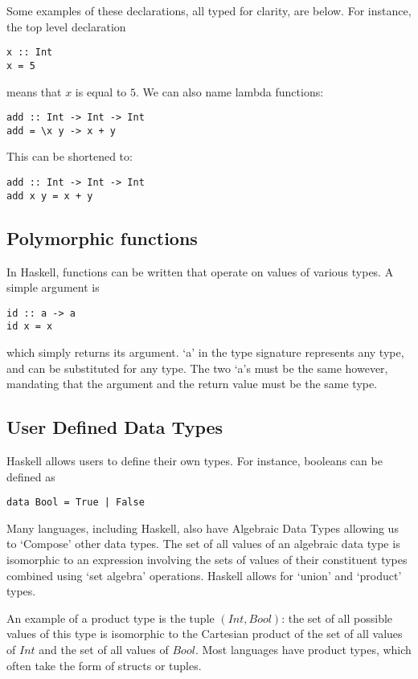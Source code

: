 Some examples of these declarations, all typed for clarity, are below. For instance, the top level declaration
\begin{verbatim}
x :: Int
x = 5
\end{verbatim}
means that $x$ is equal to $5$. We can also name lambda functions:
\begin{verbatim}
add :: Int -> Int -> Int
add = \x y -> x + y
\end{verbatim}
This can be shortened to:
\begin{verbatim}
add :: Int -> Int -> Int
add x y = x + y
\end{verbatim}

\subsection{Polymorphic functions}
In Haskell, functions can be written that operate on values of various types. A simple argument is 

\begin{verbatim}
id :: a -> a
id x = x
\end{verbatim}
\noindent which simply returns its argument. `a' in the type signature represents any type, and can be substituted for any type. The two `a's must be the same however, mandating that the argument and the return value must be the same type.  

\subsection{User Defined Data Types}
Haskell allows users to define their own types. For instance, booleans can be defined as
\begin{verbatim}
data Bool = True | False
\end{verbatim}

Many languages, including Haskell, also have Algebraic Data Types allowing us to `Compose' other data types. The set of all values of an algebraic data type is isomorphic to an expression involving the sets of values of their constituent types combined using `set algebra' operations. Haskell allows for `union' and `product' types.  

An example of a product type is the tuple \((Int, Bool)\): the set of all possible values of this type is isomorphic to the Cartesian product of the set of all values of \(Int\) and the set of all values of $Bool$. Most languages have product types, which often take the form of structs or tuples. 

